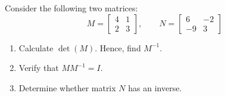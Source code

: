 \bigskip

\begin{problem}
Consider the following two matrices:
\[
M = \begin{bmatrix} 4 & 1 \\ 2 & 3 \end{bmatrix}, \qquad N = \begin{bmatrix} 6 & -2 \\ -9 & 3 \end{bmatrix}
\]

\begin{enumerate}[label=\textbf{(\alph*)}]
  \item Calculate $\det(M)$. Hence, find $M^{-1}$.
  \item Verify that $M M^{-1} = I$.
  \item Determine whether matrix $N$ has an inverse.
\end{enumerate}
\end{problem}

